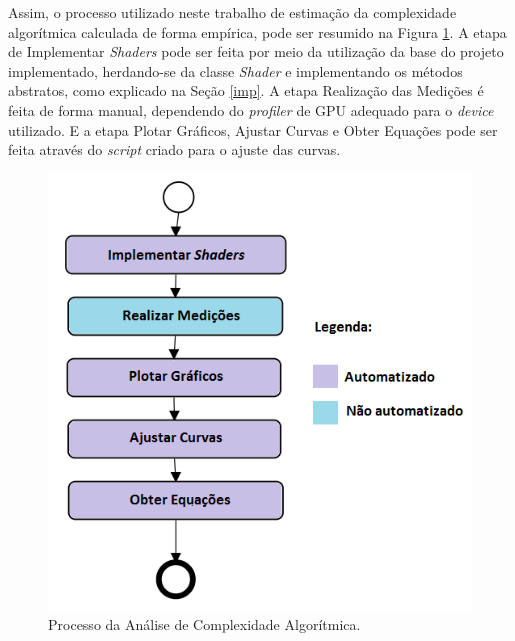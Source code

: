 	Assim, o processo utilizado neste trabalho de estimação da complexidade algorítmica calculada de forma empírica, pode ser resumido na Figura \ref{processo}. A etapa de Implementar \textit{Shaders} pode ser feita por meio da utilização da base do projeto implementado, herdando-se da classe \textit{Shader} e implementando os métodos abstratos, como explicado na Seção \ref{imp}. A etapa Realização das Medições é feita de forma manual, dependendo do \textit{profiler} de GPU adequado para o \textit{device} utilizado. E a etapa Plotar Gráficos, Ajustar Curvas e Obter Equações pode ser feita através do \textit{script} criado para o ajuste das curvas.

	\begin{figure}[ht]
	\centering
		\includegraphics[keepaspectratio=true,scale=0.5]{figuras/processo.png}
	\caption{Processo da Análise de Complexidade Algorítmica.}
	\label{processo}
	\end{figure}
